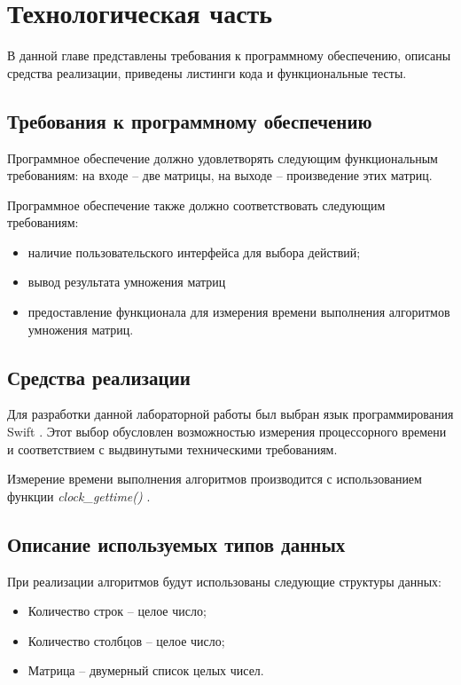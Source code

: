 \chapter{Технологическая часть}

В данной главе представлены требования к программному обеспечению, описаны средства реализации, приведены листинги кода и функциональные тесты.

\section{Требования к программному обеспечению}\label{section:requirements}

Программное обеспечение должно удовлетворять следующим функциональным требованиям: на входе -- две матрицы, на выходе -- произведение этих матриц.

Программное обеспечение также должно соответствовать следующим требованиям:
\begin{itemize}[label=---]
	\item наличие пользовательского интерфейса для выбора действий;
	\item вывод результата умножения матриц
	\item предоставление функционала для измерения времени выполнения алгоритмов умножения матриц.
\end{itemize}

\section{Средства реализации}

Для разработки данной лабораторной работы был выбран язык программирования Swift \cite{swift}. 
Этот выбор обусловлен возможностью измерения процессорного времени \cite{cpu-time-measure} и соответствием с выдвинутыми техническими требованиям.

Измерение времени выполнения алгоритмов производится с использованием функции \textit{clock\_gettime()} \cite{cpu-time-measure}.

\section{Описание используемых типов данных}
При реализации алгоритмов будут использованы следующие структуры данных:
\begin{itemize}
	\item Количество строк -- целое число;
	\item Количество столбцов -- целое число;
	\item Матрица -- двумерный список целых чисел.
\end{itemize}

